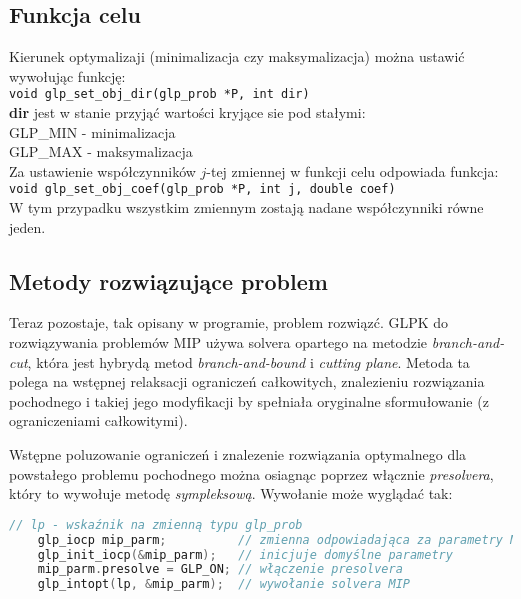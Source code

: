 \subsection{Funkcja celu}
Kierunek optymalizaji (minimalizacja czy maksymalizacja) można ustawić wywołując funkcję: \\
\verb|void glp_set_obj_dir(glp_prob *P, int dir)| \\
\textbf{dir} jest w stanie przyjąć wartości kryjące sie pod stałymi: \\
GLP\_MIN - minimalizacja \\
GLP\_MAX - maksymalizacja \\

Za ustawienie współczynników $j$-tej zmiennej w funkcji celu odpowiada funkcja: \\
\verb|void glp_set_obj_coef(glp_prob *P, int j, double coef)| \\
W tym przypadku wszystkim zmiennym zostają nadane współczynniki równe jeden.

\subsection{Metody rozwiązujące problem}
Teraz pozostaje, tak opisany w programie, problem rozwiązć. GLPK do rozwiązywania problemów MIP używa solvera opartego na metodzie \textit{branch-and-cut}, która jest hybrydą metod \textit{branch-and-bound} i \textit{cutting plane}. 
Metoda ta polega na wstępnej relaksacji ograniczeń całkowitych, znalezieniu rozwiązania pochodnego i takiej jego modyfikacji by spełniała oryginalne sformułowanie (z ograniczeniami całkowitymi).

Wstępne poluzowanie ograniczeń i znalezenie rozwiązania optymalnego dla powstałego problemu pochodnego można osiagnąc poprzez włącznie \textit{presolvera}, który to wywołuje metodę \textit{sympleksową}.
Wywołanie może wyglądać tak:
\begin{lstlisting}[language=C]
	// lp - wskaźnik na zmienną typu glp_prob
	glp_iocp mip_parm;          // zmienna odpowiadająca za parametry MIP
	glp_init_iocp(&mip_parm);   // inicjuje domyślne parametry
	mip_parm.presolve = GLP_ON; // włączenie presolvera
	glp_intopt(lp, &mip_parm);  // wywołanie solvera MIP
\end{lstlisting}


